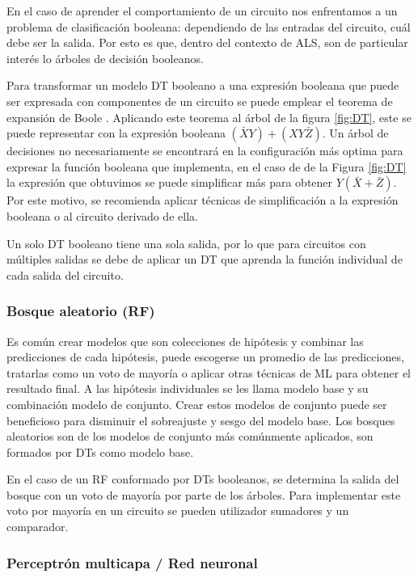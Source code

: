 En el caso de aprender el comportamiento de un circuito nos enfrentamos a un
problema de clasificación booleana: dependiendo de las entradas del circuito,
cuál debe ser la salida. Por esto es que, dentro del contexto de ALS, son de
particular interés lo árboles de decisión booleanos.

Para transformar un modelo DT booleano a una expresión booleana que puede ser
expresada con componentes de un circuito se puede emplear el teorema de
expansión de Boole \cite{boole_investigation_1854}. Aplicando este teorema al
árbol de la figura \ref{fig:DT}, este se puede representar con la expresión
booleana $(\bar{X}Y) + (XY\bar{Z})$. Un árbol de decisiones no necesariamente
se encontrará en la configuración más optima para expresar la función booleana
que implementa, en el caso de de la Figura \ref{fig:DT} la expresión que
obtuvimos se puede simplificar más para obtener $Y(\bar{X} + \bar{Z})$. Por
este motivo, se recomienda aplicar técnicas de simplificación a la expresión
booleana o al circuito derivado de ella.

Un solo DT booleano tiene una sola salida, por lo que para circuitos con
múltiples salidas se debe de aplicar un DT que aprenda la función individual de
cada salida del circuito.

\subsubsection{Bosque aleatorio (RF)}

Es común crear modelos que son colecciones de hipótesis y combinar las
predicciones de cada hipótesis, puede escogerse un promedio de las
predicciones, tratarlas como un voto de mayoría o aplicar otras técnicas de ML
para obtener el resultado final. A las hipótesis individuales se les llama
modelo base y su combinación modelo de conjunto.
Crear estos modelos de conjunto puede ser beneficioso para disminuir el
sobreajuste y sesgo del modelo base.
Los bosques aleatorios son de los modelos de conjunto más comúnmente aplicados,
son formados por DTs como modelo base. \cite{russell2016artificial}

En el caso de un RF conformado por DTs booleanos, se determina la salida del
bosque con un voto de mayoría por parte de los árboles. Para implementar este
voto por mayoría en un circuito se pueden utilizador sumadores y un comparador.

\subsubsection{Perceptrón multicapa / Red neuronal}

